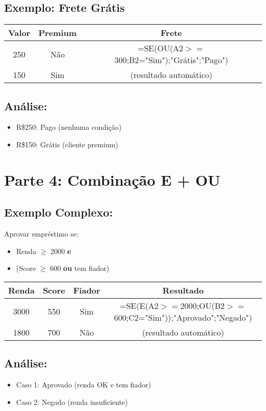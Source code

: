 \documentclass[11pt]{article}
\begin{document}
\subsection*{Exemplo: Frete Grátis}
\begin{tabular}{|c|c|c|}
\hline
Valor & Premium & Frete \\
\hline
250 & Não & =SE(OU(A2$>=$300;B2="Sim");"Grátis";"Pago") \\
\hline
150 & Sim & (resultado automático) \\
\hline
\end{tabular}

\subsection*{Análise:}
\begin{itemize}
\item R\$250: Pago (nenhuma condição)
\item R\$150: Grátis (cliente premium)
\end{itemize}

\section*{Parte 4: Combinação E + OU}

\subsection*{Exemplo Complexo:}
Aprovar empréstimo se:
\begin{itemize}
\item Renda $\geq$ 2000 \textbf{e}
\item (Score $\geq$ 600 \textbf{ou} tem fiador)
\end{itemize}

\begin{tabular}{|c|c|c|c|}
\hline
Renda & Score & Fiador & Resultado \\
\hline
3000 & 550 & Sim & =SE(E(A2$>=$2000;OU(B2$>=$600;C2="Sim"));"Aprovado";"Negado") \\
\hline
1800 & 700 & Não & (resultado automático) \\
\hline
\end{tabular}

\subsection*{Análise:}
\begin{itemize}
\item Caso 1: Aprovado (renda OK e tem fiador)
\item Caso 2: Negado (renda insuficiente)
\end{itemize}
\end{document}
